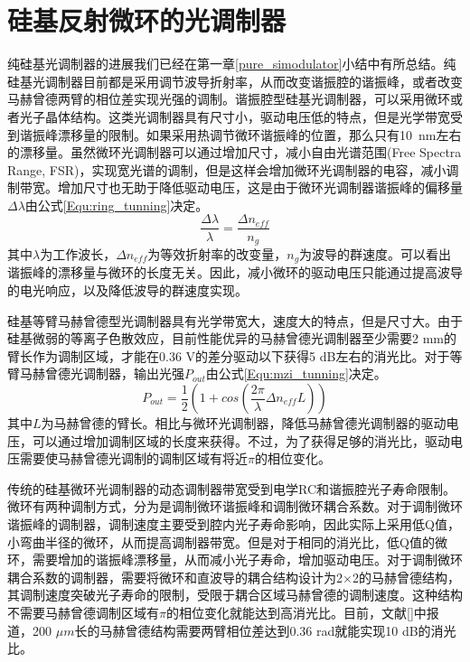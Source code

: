 \chapter{硅基反射微环的光调制器}
纯硅基光调制器的进展我们已经在第一章\ref{pure_simodulator}小结中有所总结。纯硅基光调制器目前都是采用调节波导折射率，从而改变谐振腔的谐振峰，或者改变马赫曾德两臂的相位差实现光强的调制。谐振腔型硅基光调制器，可以采用微环或者光子晶体结构。这类光调制器具有尺寸小，驱动电压低的特点，但是光学带宽受到谐振峰漂移量的限制。如果采用热调节微环谐振峰的位置，那么只有10~nm左右的漂移量。虽然微环光调制器可以通过增加尺寸，减小自由光谱范围(Free Spectra Range, FSR)，实现宽光谱的调制，但是这样会增加微环光调制器的电容，减小调制带宽。增加尺寸也无助于降低驱动电压，这是由于微环光调制器谐振峰的偏移量$\Delta \lambda$由公式\ref{Equ:ring_tunning}决定。
\begin{equation}
\label{Equ:ring_tunning}
\frac{\Delta \lambda}{\lambda} = \frac{\Delta n_{eff}}{n_g}
\end{equation}
其中$\lambda$为工作波长，$\Delta n_{eff}$为等效折射率的改变量，$n_g$为波导的群速度。可以看出谐振峰的漂移量与微环的长度无关。因此，减小微环的驱动电压只能通过提高波导的电光响应，以及降低波导的群速度实现。

硅基等臂马赫曾德型光调制器具有光学带宽大，速度大的特点，但是尺寸大。由于硅基微弱的等离子色散效应，目前性能优异的马赫曾德光调制器至少需要2 mm的臂长作为调制区域，才能在0.36 V的差分驱动以下获得5 dB左右的消光比\cite{Ding2013electro}。对于等臂马赫曾德光调制器，输出光强$P_{out}$由公式\ref{Equ:mzi_tunning}决定。
\begin{equation}
\label{Equ:mzi_tunning}
P_{out} = \frac{1}{2}\left(1+cos\left(\frac{2\pi}{\lambda}\Delta n_{eff}L\right)\right)
\end{equation}
其中$L$为马赫曾德的臂长。相比与微环光调制器，降低马赫曾德光调制器的驱动电压，可以通过增加调制区域的长度来获得。不过，为了获得足够的消光比，驱动电压需要使马赫曾德光调制的调制区域有将近$\pi$的相位变化。

传统的硅基微环光调制器的动态调制器带宽受到电学RC和谐振腔光子寿命限制\cite{sacher2008dynamics, pile2014small}。微环有两种调制方式，分为是调制微环谐振峰和调制微环耦合系数。对于调制微环谐振峰的调制器，调制速度主要受到腔内光子寿命影响，因此实际上采用低Q值，小弯曲半径的微环，从而提高调制器带宽。但是对于相同的消光比，低Q值的微环，需要增加的谐振峰漂移量，从而减小光子寿命，增加驱动电压。对于调制微环耦合系数的调制器，需要将微环和直波导的耦合结构设计为2$\times$2的马赫曾德结构\cite{sacher2013coupling}，其调制速度突破光子寿命的限制，受限于耦合区域马赫曾德的调制速度。这种结构不需要马赫曾德调制区域有$\pi$的相位变化就能达到高消光比。目前，文献[]中报道，200 $\mu m$长的马赫曾德结构需要两臂相位差达到0.36 rad就能实现10 dB的消光比。

